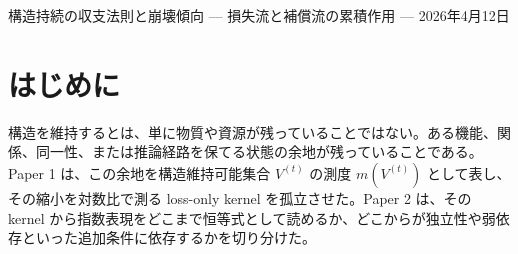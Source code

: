 \documentclass[12pt,a4paper]{article}
\begin{document}
\PaperTitleBlock
  {構造持続の収支法則と崩壊傾向}
  {— 損失流と補償流の累積作用 —}
  {2026年4月12日}

\begin{abstract}
構造持続の最小形式は、これまで主として loss-only の収縮モードとして定式化されてきた。そこでは、構造を維持できる状態集合の縮小を対数比で測る loss kernel が与えられ、残存可能性が指数核で表される。しかし、現実の多くの系は閉じた収縮系ではない。修復、学習、冗長化、外部支援、ロールバックのように、構造維持可能領域を再拡大する作用が同時に働く。

本稿は、この開いた構造系を扱うために、構造持続の最小核を「損失量」から「損失流と補償流の収支」へ移す。各時刻の損失流を \(\ell_{t}\)、補償流を \(g_{t}\)、その差を

\[
a_{t} := \ell_{t} - g_{t}
\]

と置き、累積作用 \(A_{n} := \sum_{t<n} a_{t}\) に対して

\[
m(V^{(n)}) = m(V^{(0)}) e^{-A_{n}}
\]

が成り立つことを最小収支恒等式として述べる。ここで \(a_{t}>0\) は損失優位、\(a_{t}=0\) は維持、\(a_{t}<0\) は補償優位を表す。したがって、本稿でいう「収支」は equilibrium を意味しない。崩壊・維持・回復の三つの傾向を、同じ差し引き量の符号として扱うための収支 \((accounting)\) の法則である。

本稿の役割は、構造持続理論が普遍法則として確立したと宣言することではない。むしろ、Paper 1 の loss-only kernel、Paper 2 の条件つき導出と層分離、集合値力学補論の符号付き指数核、Lean 形式化における expectation-level tendency、Mixed-CSP の有限時間 concentration、および Route C companion I / II の repair / external metabolism の観察を、単一の「構造収支律」として読み直すための主理論 spine の第三層を与えることである。論理依存としては 1 → 2 → 3 だが、読者導線としては Paper 0 から本稿へ入り、必要に応じて Paper 1 / Paper 2 に降りる読み方を想定している。
\end{abstract}

\section{はじめに}\label{ux306fux3058ux3081ux306b}

構造を維持するとは、単に物質や資源が残っていることではない。ある機能、関係、同一性、または推論経路を保てる状態の余地が残っていることである。Paper 1 は、この余地を構造維持可能集合 \(V^{(t)}\) の測度 \(m(V^{(t)})\) として表し、その縮小を対数比で測る loss-only kernel を孤立させた。Paper 2 は、その kernel から指数表現をどこまで恒等式として読めるか、どこからが独立性や弱依存といった追加条件に依存するかを切り分けた。
\end{document}
